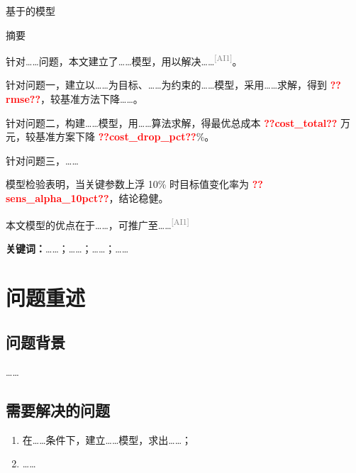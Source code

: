 \documentclass[UTF8,12pt,fontset=windows]{ctexart}
\newcommand{\res}[1]{\textcolor{red}{\textbf{??#1??}}}
\newcommand{\aiflag}[1]{\textsuperscript{\textcolor{gray}{[AI#1]}}}
\begin{document}
\begin{center}
  {\heiti 基于\underline{\quad\quad\quad}的\underline{\quad\quad\quad}模型}
\end{center}

\vspace{0.6em}
\begin{center}
  {\heiti 摘\quad 要}
\end{center}

\vspace{0.4em}

针对……问题，本文建立了……模型，用以解决……\aiflag{1}。

针对问题一，建立以……为目标、……为约束的……模型，采用……求解，得到 \res{rmse}，较基准方法下降……。

针对问题二，构建……模型，用……算法求解，得最优总成本 \res{cost_total} 万元，较基准方案下降 \res{cost_drop_pct}\%。

针对问题三，……

模型检验表明，当关键参数上浮 10\% 时目标值变化率为 \res{sens_alpha_10pct}，结论稳健。%

本文模型的优点在于……，可推广至……\aiflag{1}

\vspace{0.8em}
\noindent\textbf{关键词：}\quad ……；……；……；……

\newpage

\section{问题重述}

\subsection{问题背景}
……

\subsection{需要解决的问题}
\begin{enumerate}[label=\textbf{问题\arabic*}：]
  \item 在……条件下，建立……模型，求出……；
  \item ……
\end{enumerate}
\end{document}
